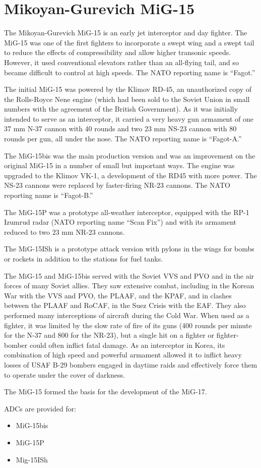 \section*{Mikoyan-Gurevich MiG-15}

The Mikoyan-Gurevich MiG-15 is an early jet interceptor and day fighter. The MiG-15 was one of the first fighters to incorporate a swept wing and a swept tail to reduce the effects of compressibility and allow higher transonic speeds. However, it used conventional elevators rather than an all-flying tail, and so became difficult to control at high speeds. The NATO reporting name is “Fagot.”

The initial MiG-15 was powered by the Klimov RD-45, an unauthorized copy of the Rolls-Royce Nene engine (which had been sold to the Soviet Union in small numbers with the agreement of the British Government). As it was initially intended to serve as an interceptor, it carried a very heavy gun armament of one 37 mm N-37 cannon with 40 rounds and two 23 mm NS-23 cannon with 80 rounds per gun, all under the nose. The NATO reporting name is “Fagot-A.”

The MiG-15bis was the main production version and was an improvement on the original MiG-15 in a number of small but important ways. The engine was upgraded to the Klimov VK-1, a development of the RD45 with more power. The NS-23 cannons were replaced by faster-firing NR-23 cannons. The NATO reporting name is “Fagot-B.”

The MiG-15P was a prototype all-weather interceptor, equipped with the RP-1 Izumrud radar (NATO reporting name “Scan Fix”) and with its armament reduced to two 23 mm NR-23 cannons.

The MiG-15ISh is a prototype attack version with pylons in the wings for bombs or rockets in addition to the stations for fuel tanks.

The MiG-15 and MiG-15bis served with the Soviet VVS and PVO and in the air forces of many Soviet allies. They saw extensive combat, including in the Korean War with the VVS and PVO, the PLAAF, and the KPAF, and in clashes between the PLAAF and RoCAF, in the Suez Crisis with the EAF. They also performed many interceptions of aircraft during the Cold War. When used as a fighter, it was limited by the slow rate of fire of its guns (400 rounds per minute for the N-37 and 800 for the NR-23), but a single hit on a fighter or fighter-bomber could often inflict fatal damage. As an interceptor in Korea, its combination of high speed and powerful armament allowed it to inflict heavy losses of USAF B-29 bombers engaged in daytime raids and effectively force them to operate under the cover of darkness.

The MiG-15 formed the basis for the development of the MiG-17.

ADCs are provided for:
\begin{itemize}
    \item MiG-15bis
    \item MiG-15P
    \item Mig-15ISh
\end{itemize}
